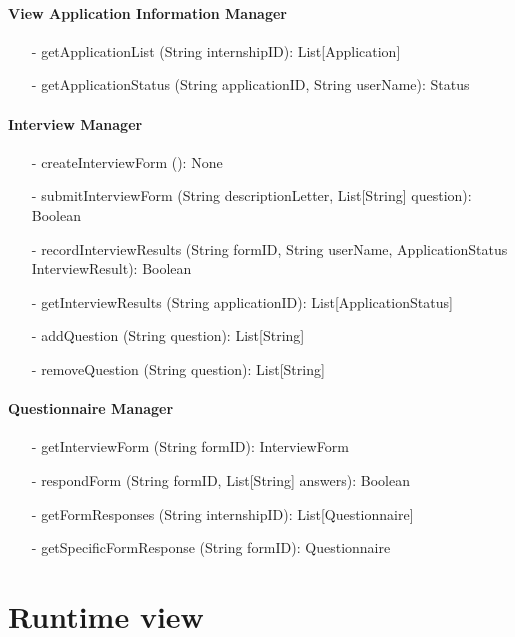 \paragraph{View Application Information Manager}
\begin{itemize}
    \item[-] getApplicationList (String internshipID): List[Application]
    \item[-] getApplicationStatus (String applicationID, String userName): Status
\end{itemize}

\paragraph{Interview Manager}
\begin{itemize}
    \item[-] createInterviewForm (): None
    \item[-] submitInterviewForm (String descriptionLetter, List[String] question): Boolean
    \item[-] recordInterviewResults (String formID, String userName, ApplicationStatus InterviewResult): Boolean
    \item[-] getInterviewResults (String applicationID): List[ApplicationStatus]
    \item[-] addQuestion (String question): List[String]
    \item[-] removeQuestion (String question): List[String]
\end{itemize}

\paragraph{Questionnaire Manager}
\begin{itemize}
    \item[-] getInterviewForm (String formID): InterviewForm
    \item[-] respondForm (String formID, List[String] answers): Boolean
    \item[-] getFormResponses (String internshipID): List[Questionnaire]
    \item[-] getSpecificFormResponse (String formID): Questionnaire
\end{itemize}


\section{Runtime view}\label{sec:runtime view}



